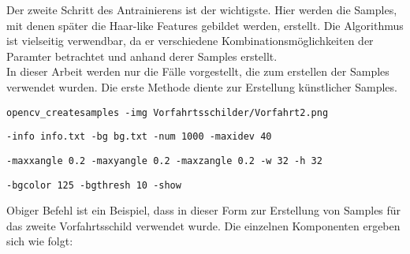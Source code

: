 Der zweite Schritt des Antrainierens ist der wichtigste. Hier werden die Samples, mit denen später die Haar-like Features gebildet werden, erstellt. Die Algorithmus ist vielseitig verwendbar, da er verschiedene Kombinationsmöglichkeiten der Paramter betrachtet und anhand derer Samples erstellt.\\
In dieser Arbeit werden nur die Fälle vorgestellt, die zum erstellen der Samples verwendet wurden. Die erste Methode diente zur Erstellung künstlicher Samples.
\begin{lstlisting}
opencv_createsamples -img Vorfahrtsschilder/Vorfahrt2.png
\end{lstlisting}
\begin{lstlisting}
-info info.txt -bg bg.txt -num 1000 -maxidev 40
\end{lstlisting}
\begin{lstlisting}
-maxxangle 0.2 -maxyangle 0.2 -maxzangle 0.2 -w 32 -h 32
\end{lstlisting}
\begin{lstlisting}
-bgcolor 125 -bgthresh 10 -show
\end{lstlisting}
Obiger Befehl ist ein Beispiel, dass in dieser Form zur Erstellung von Samples für das zweite Vorfahrtsschild verwendet wurde. Die einzelnen Komponenten ergeben sich wie folgt:
